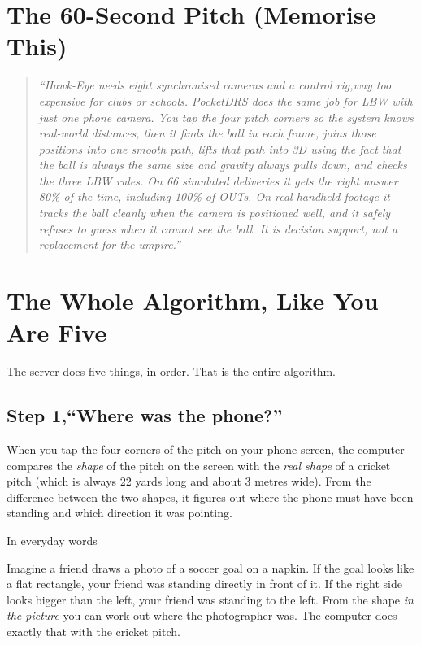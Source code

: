\documentclass[11pt,a4paper]{article}
\newcommand{\analogy}[1]{%
  \par\vspace{6pt}%
  \noindent
  \colorbox{WarmTint}{%
    \begin{minipage}{\dimexpr\textwidth-2\fboxsep\relax}%
      \color{white}\bfseries\strut In everyday words%
    \end{minipage}%
  }\par\nobreak
  \noindent
  \colorbox{MutedBg}{%
    \begin{minipage}{\dimexpr\textwidth-2\fboxsep\relax}%
      \color{black}\setlength{\parskip}{4pt}\strut #1\strut%
    \end{minipage}%
  }%
  \par\vspace{6pt}%
}
\begin{document}
\newpage

\section{The 60-Second Pitch (Memorise This)}

\begin{quote}\itshape
``Hawk-Eye needs eight synchronised cameras and a control rig,way too expensive for clubs or schools. PocketDRS does the same job for LBW with just one phone camera. You tap the four pitch corners so the system knows real-world distances, then it finds the ball in each frame, joins those positions into one smooth path, lifts that path into 3D using the fact that the ball is always the same size and gravity always pulls down, and checks the three LBW rules. On 66 simulated deliveries it gets the right answer 80\% of the time, including 100\% of OUTs. On real handheld footage it tracks the ball cleanly when the camera is positioned well, and it safely refuses to guess when it cannot see the ball. It is decision support, not a replacement for the umpire.''
\end{quote}

\section{The Whole Algorithm, Like You Are Five}

The server does five things, in order. That is the entire algorithm.

\subsection{Step 1,``Where was the phone?''}

When you tap the four corners of the pitch on your phone screen, the computer compares the \emph{shape} of the pitch on the screen with the \emph{real shape} of a cricket pitch (which is always 22 yards long and about 3 metres wide). From the difference between the two shapes, it figures out where the phone must have been standing and which direction it was pointing.

\analogy{Imagine a friend draws a photo of a soccer goal on a napkin. If the goal looks like a flat rectangle, your friend was standing directly in front of it. If the right side looks bigger than the left, your friend was standing to the left. From the shape \emph{in the picture} you can work out where the photographer was. The computer does exactly that with the cricket pitch.}
\end{document}
